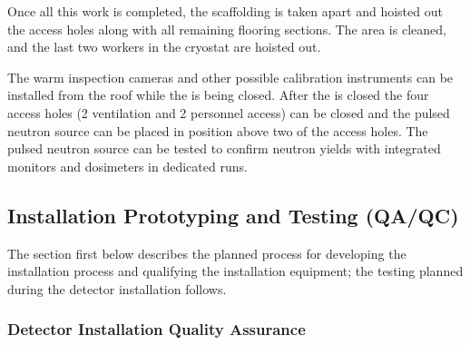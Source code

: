 Once all this work is completed, the scaffolding is taken apart and hoisted out the access holes along with all remaining flooring sections. The area is cleaned, and the last two workers in the cryostat are hoisted out. 

The warm inspection cameras and other possible calibration instruments can be installed from the roof while the  is being closed. 
After the  is closed the four access holes (2 ventilation and 2 personnel access)  can be closed and the pulsed neutron source can be placed in position above two of the access holes. The pulsed neutron source can be tested to confirm neutron yields with integrated monitors and dosimeters in dedicated runs.





\subsection{Installation Prototyping and Testing (QA/QC)}
\label{sec:fdsp-tc-inst-qaqc}

The section first below describes the planned  process for developing the installation process and qualifying the installation equipment; the  testing planned during the detector installation follows. 

\subsubsection{Detector Installation Quality Assurance}

